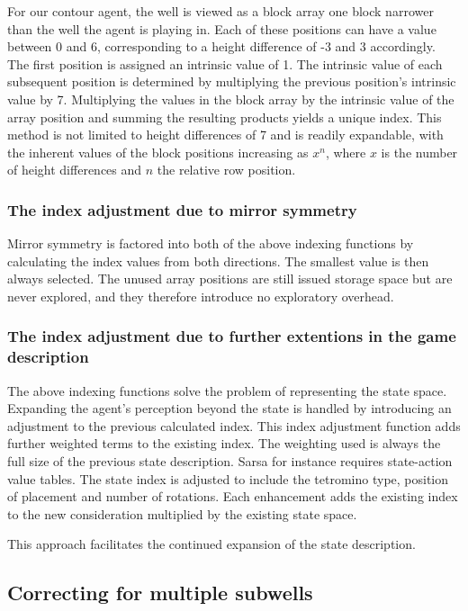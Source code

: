 \documentclass{rucsthesis}
\begin{document}
For our contour agent, the well is viewed as a block array one block narrower than the well the agent is playing in. Each of these positions can have a value between 0 and 6, corresponding to a height difference of -3 and 3 accordingly. The first position is assigned an intrinsic value of 1. The intrinsic value of each subsequent position is determined by multiplying the previous position's intrinsic value by 7. Multiplying the values in the block array by the intrinsic value of the array position and summing the resulting products yields a unique index. This method is not limited to height differences of 7 and is readily expandable, with the inherent values of the block positions increasing as $x^n$, where $x$ is the number of height differences and $n$ the relative row position.

\subsubsection{The index adjustment due to mirror symmetry}

Mirror symmetry is factored into both of the above indexing functions by calculating the index values from both directions. The smallest value is then always selected. The unused array positions are still issued storage space but are never explored, and they therefore introduce no exploratory overhead.

\subsubsection{The index adjustment due to further extentions in the game description}

The above indexing functions solve the problem of representing the state space. Expanding the agent's perception beyond the state is handled by introducing an adjustment to the previous calculated index. This index adjustment function adds further weighted terms to the existing index. The weighting used is always the full size of the previous state description. Sarsa for instance requires state-action value tables. The state index is adjusted to include the tetromino type, position of placement and number of rotations. Each enhancement adds the existing index to the new consideration multiplied by the existing state space.

This approach facilitates the continued expansion of the state description. 
 
\subsection{Correcting for multiple subwells \label{corsub}}
\end{document}
